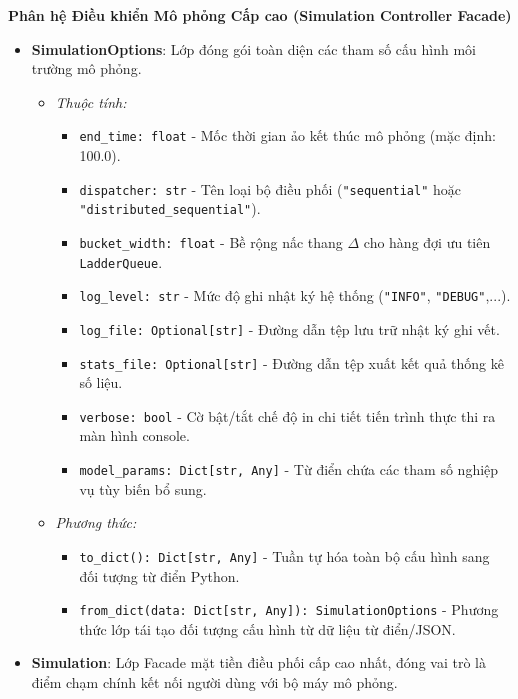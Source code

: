 \textbf{\color{red}Phân hệ Điều khiển Mô phỏng Cấp cao (Simulation Controller Facade)}
\begin{itemize}[leftmargin=1.5em, itemsep=8pt]
\item \textbf{SimulationOptions}: Lớp đóng gói toàn diện các tham số cấu hình môi trường mô phỏng.

\begin{itemize}[leftmargin=1.2em, label={}, itemsep=3pt]
\item[\textendash] \textit{Thuộc tính:}
\begin{itemize}[leftmargin=1.5em, label=+, itemsep=2pt]
\item \texttt{end\_time: float} - Mốc thời gian ảo kết thúc mô phỏng (mặc định: 100.0).
\item \texttt{dispatcher: str} - Tên loại bộ điều phối (\texttt{"sequential"} hoặc \texttt{"distributed\_\allowbreak sequential"}).
\item \texttt{bucket\_width: float} - Bề rộng nấc thang $\Delta$ cho hàng đợi ưu tiên \texttt{LadderQueue}.
\item \texttt{log\_level: str} - Mức độ ghi nhật ký hệ thống (\texttt{"INFO"}, \texttt{"DEBUG"},...).
\item \texttt{log\_file: Optional[str]} - Đường dẫn tệp lưu trữ nhật ký ghi vết.
\item \texttt{stats\_file: Optional[str]} - Đường dẫn tệp xuất kết quả thống kê số liệu.
\item \texttt{verbose: bool} - Cờ bật/tắt chế độ in chi tiết tiến trình thực thi ra màn hình console.
\item \texttt{model\_params: Dict[str, Any]} - Từ điển chứa các tham số nghiệp vụ tùy biến bổ sung.
\end{itemize}

\item[\textendash] \textit{Phương thức:}
\begin{itemize}[leftmargin=1.5em, label=+, itemsep=2pt]
\item \texttt{to\_dict(): Dict[str, Any]} - Tuần tự hóa toàn bộ cấu hình sang đối tượng từ điển Python.
\item \texttt{from\_dict(data: Dict[str, Any]): SimulationOptions} - Phương thức lớp tái tạo đối tượng cấu hình từ dữ liệu từ điển/JSON.
\end{itemize}
\end{itemize}

\item \textbf{Simulation}: Lớp Facade mặt tiền điều phối cấp cao nhất, đóng vai trò là điểm chạm chính kết nối người dùng với bộ máy mô phỏng.


\end{itemize}
